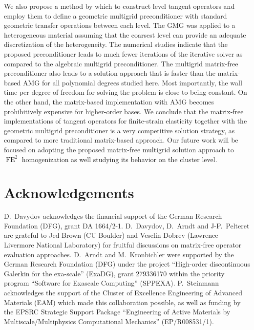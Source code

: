 \documentclass[AMA,STIX1COL]{WileyNJD-v2}
\begin{document}
We also propose a method by which to construct level tangent operators and employ them to define a geometric multigrid preconditioner
with standard geometric transfer operations between each level.
The GMG was applied to a heterogeneous material assuming that the coarsest level can provide an adequate discretization of the heterogeneity.
The numerical studies indicate that the proposed preconditioner
leads to much fewer iterations of the iterative solver as compared to the algebraic multigrid preconditioner.
The multigrid matrix-free preconditioner also
leads to a solution approach that is faster than the matrix-based AMG for all polynomial degrees studied here.
Most importantly, the wall time per degree of freedom for solving the problem is close to being constant.
On the other hand, the matrix-based implementation with AMG becomes prohibitively expensive for higher-order bases.
We conclude that the matrix-free implementations of tangent operators for finite-strain elasticity together with
the geometric multigrid preconditioner is a very competitive solution strategy, as compared to more traditional matrix-based approach.
Our future work will be focused on adopting the proposed matrix-free multigrid solution approach to $\operatorname{FE}^2$ homogenization
as well studying its behavior on the cluster level.

\section*{Acknowledgements}

D.~Davydov acknowledges the financial support of the German Research Foundation (DFG), grant DA 1664/2-1.
D.~Davydov, D.~Arndt and J-P.~Pelteret are grateful to Jed Brown (CU Boulder) and Veselin Dobrev (Lawrence Livermore National Laboratory) for fruitful discussions on matrix-free operator evaluation approaches.
D.~Arndt and M.~Kronbichler were supported by the German Research Foundation (DFG) under the project ``High-order discontinuous
Galerkin for the exa-scale'' (\mbox{ExaDG}), grant 279336170 within the priority program ``Software
for Exascale Computing'' (SPPEXA).
P.~Steinmann acknowledges the support of the Cluster of Excellence Engineering of Advanced Materials (EAM) which made this collaboration possible, as well as funding by the EPSRC Strategic Support Package ``Engineering of Active Materials by Multiscale/Multiphysics Computational Mechanics'' (EP/R008531/1).

\appendix
\end{document}
